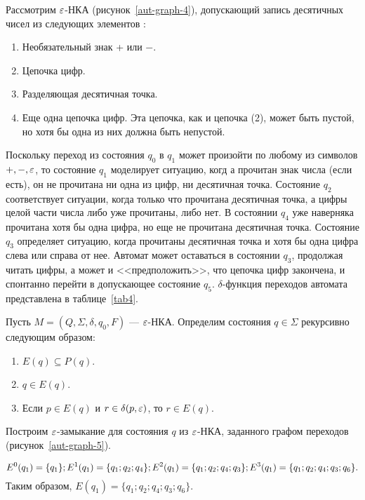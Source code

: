\begin{myexample}
Рассмотрим $\varepsilon$-НКА (рисунок~\ref{aut-graph-4}), допускающий запись десятичных чисел из следующих элементов $\colon$
\begin{enumerate}
   \item Необязательный знак + или $-$.
   \item Цепочка цифр.
   \item Разделяющая десятичная точка.
   \item Еще одна цепочка цифр. Эта цепочка, как и цепочка (2), может быть пустой, но хотя бы одна из них должна быть непустой.
\end{enumerate}

Поскольку переход из состояния $q_0$ в $q_1$ может произойти по любому из символов $+, -, \varepsilon$, то состояние $q_1$ моделирует ситуацию, когд а прочитан знак числа (если есть), он не прочитана ни одна из цифр, ни десятичная точка. Состояние $q_2$ соответствует ситуации, когда только что прочитана десятичная точка, а цифры целой части числа либо уже прочитаны, либо нет. В состоянии $q_4$ уже наверняка прочитана хотя бы одна цифра, но еще не прочитана десятичная точка. Состояние $q_3$ определяет ситуацию, когда  прочитаны десятичная точка и хотя бы одна цифра слева или справа от нее. Автомат может оставаться в состоянии $q_3$, продолжая читать цифры, а может и <<предположить>>, что цепочка цифр закончена, и спонтанно перейти в допускающее состояние $q_5$.
$\delta$-функция переходов автомата представлена в таблице~\ref{tab4}.

\end{myexample}

Пусть $M = (Q,\Sigma, \delta, q_0, F)$ --- $\varepsilon$-НКА. Определим  состояния $q \in \Sigma$ рекурсивно следующим образом:
\begin{enumerate}
   \item $E(q) \subseteq P(q)$.
   \item $q \in E(q)$.
   \item Если $p \in E(q)$ и $r \in \delta(p, \varepsilon)$, то $r \in E(q)$.
\end{enumerate}

\begin{myexample}
\label{example-413}
Построим $\varepsilon$-замыкание для состояния $q$ из $\varepsilon$-НКА, заданного графом переходов (рисунок~\ref{aut-graph-5}).

\[
	  E^0(q_1) = \{q_1\}; \\
    E^1(q_1) = \{ q_1; q_2; q_4 \}; \\
    E^2(q_1) = \{ q_1; q_2; q_4; q_3 \}; \\
    E^3(q_1) = \{ q_1; q_2; q_4; q_3; q_6 \}. \\
\]
Таким образом, $E(q_1) = \{ q_1; q_2; q_4; q_3; q_6 \} $.
\end{myexample}

